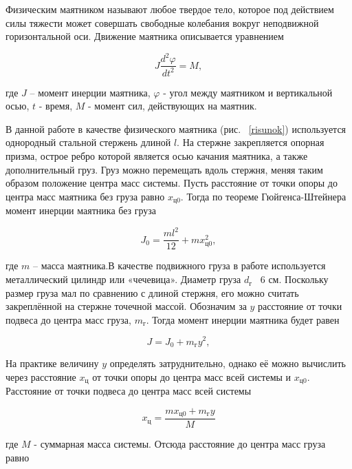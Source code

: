 \documentclass[a4paper,12pt]{article} %
\begin{document}
Физическим маятником называют любое твердое тело, которое под действием силы тяжести может совершать свободные колебания вокруг неподвижной горизонтальной оси. Движение маятника описывается уравнением

\begin{equation}
J\frac{d^2\varphi}{dt^2}=M,
\label{osnova}
\end{equation}

\noindent где $ J $ -- момент инерции маятника, $ \varphi $ - угол между маятником и вертикальной осью, $ t $ - время, $ M $ - момент сил, действующих на маятник.

В данной работе в качестве физического маятника (рис.~ \ref{risunok}) используется однородный стальной стержень длиной $ l $. На стержне закрепляется опорная призма, острое ребро которой является осью качания маятника, а также дополнительный груз. Груз можно перемещать вдоль стержня, меняя таким образом положение центра масс системы. Пусть расстояние от точки опоры до центра масс маятника без груза равно $ x_\text{ц0} $. Тогда по теореме Гюйгенса-Штейнера момент инерции маятника без груза

\begin{equation}
J_0=\frac{ml^2}{12}+mx_\text{ц0}^2,
\label{momentOfInertia}
\end{equation}

\noindent где $ m $ -- масса маятника.В качестве подвижного груза в работе используется металлический цилиндр или «чечевица». Диаметр груза $ d_\text{г}$ ~6 см. Поскольку размер груза мал по сравнению с длиной стержня, его можно
считать закреплённой на стержне точечной массой. Обозначим за $ y $ расстояние от точки подвеса до центра масс груза, $ m_\text{г}$. Тогда момент
инерции маятника будет равен 

\begin{equation}
    J=J_0+m_\text{г}y^2,
\end{equation}

На практике величину $ y $ определять затруднительно, однако её можно вычислить через расстояние $ x_\text{ц} $ от точки опоры до центра масс всей системы и $ x_\text{ц0} $. Расстояние от точки подвеса до центра масс всей системы 

\begin{equation}
    x_\text{ц}=\frac{mx_\text{ц0}+m_\text{г}y}{M}
\end{equation}

\noindent где $ M $ - суммарная масса системы. Отсюда расстояние до центра масс груза равно
\end{document}
